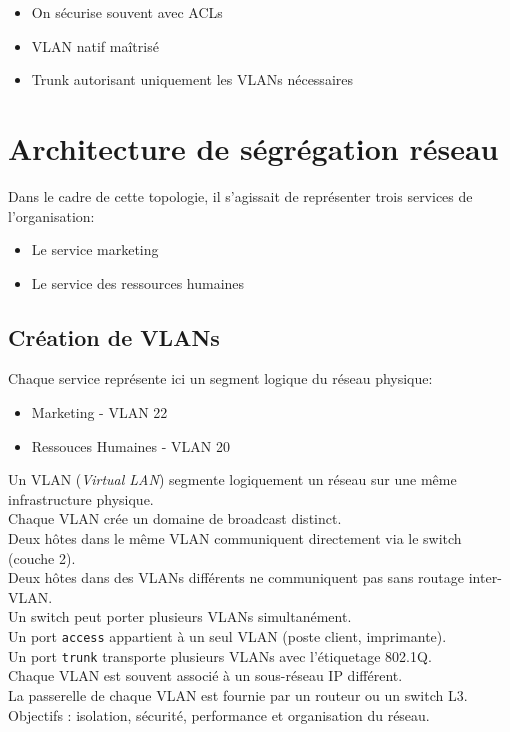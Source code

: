 \documentclass[a4paper,twoside,11pt]{article}
\begin{document}
\begin{profbox}[title=Améliorations à apporter]

  \begin{itemize}
      \item On sécurise souvent avec ACLs
      \item VLAN natif maîtrisé
      \item Trunk autorisant uniquement les VLANs nécessaires
  \end{itemize}

\end{profbox}



\section{Architecture de ségrégation réseau}

Dans le cadre de cette topologie, il s'agissait de représenter trois services de l'organisation:
\begin{itemize}
  \item Le service marketing 
  \item Le service des ressources humaines 
\end{itemize}
\bigskip 

\subsection{Création de VLANs}

Chaque service représente ici un segment logique du réseau physique:
\begin{itemize}
  \item Marketing - VLAN 22
  \item Ressouces Humaines - VLAN 20
\end{itemize}

\begin{definitionbox}[title=Définition d'un VLAN]
Un VLAN (\textit{Virtual LAN}) segmente logiquement un réseau sur une même infrastructure physique.\\
Chaque VLAN crée un domaine de broadcast distinct.\\
Deux hôtes dans le même VLAN communiquent directement via le switch (couche 2).\\
Deux hôtes dans des VLANs différents ne communiquent pas sans routage inter-VLAN.\\
Un switch peut porter plusieurs VLANs simultanément.\\
Un port \texttt{access} appartient à un seul VLAN (poste client, imprimante).\\
Un port \texttt{trunk} transporte plusieurs VLANs avec l’étiquetage 802.1Q.\\
Chaque VLAN est souvent associé à un sous-réseau IP différent.\\
La passerelle de chaque VLAN est fournie par un routeur ou un switch L3.\\
Objectifs : isolation, sécurité, performance et organisation du réseau.

\end{definitionbox}
\end{document}
